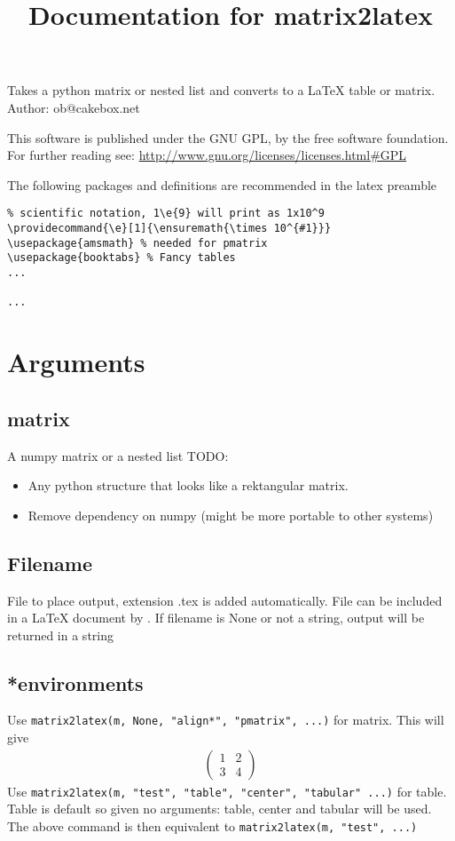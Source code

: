
\title{Documentation for matrix2latex}


\maketitle
Takes a python matrix or nested list and converts to a LaTeX table or matrix.
Author: ob@cakebox.net

This software is published under the GNU GPL, by the free software
foundation. For further reading see: 
\url{http://www.gnu.org/licenses/licenses.html#GPL}

The following packages and definitions are recommended in the latex preamble 
\begin{verbatim}
% scientific notation, 1\e{9} will print as 1x10^9
\providecommand{\e}[1]{\ensuremath{\times 10^{#1}}}
\usepackage{amsmath} % needed for pmatrix
\usepackage{booktabs} % Fancy tables
...

...
\end{verbatim}

\section{Arguments}
  
\subsection{matrix}
  A numpy matrix or a nested list
  TODO:
\begin{itemize}
\item Any python structure that looks like a rektangular matrix.
\item Remove dependency on numpy (might be more portable to other systems)
\end{itemize}

\subsection{Filename}
  File to place output, extension .tex is added automatically. File can be included in a LaTeX
  document by \verb!!. If filename is None or not a string, output will be returned in a string
  
\subsection{*environments}
  Use 
\lstinline{matrix2latex(m, None, "align*", "pmatrix", ...)} for matrix.
  This will give
  \begin{align*}
    \begin{pmatrix}
      1 & 2 \\
      3 & 4
    \end{pmatrix}
  \end{align*}
  Use 
\lstinline{matrix2latex(m, "test", "table", "center", "tabular" ...)} for table.
  Table is default so given no arguments: table, center and tabular will be used.
  The above command is then equivalent to
\lstinline{matrix2latex(m, "test", ...)}
  

